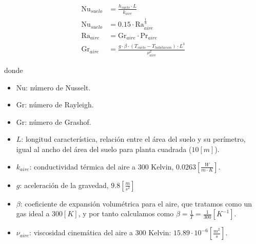 \begin{align}
	\text{Nu}_{suelo} & = \frac{h_{suelo} \cdot L}{k_{aire}}                                                    \\
	\text{Nu}_{suelo} & = 0.15 \cdot \text{Ra}_{aire}^{\frac{1}{3}}  \label{eq:empirical_nu_natural_convection} \\
	\text{Ra}_{aire}  & = \text{Gr}_{aire} \cdot \text{Pr}_{aire}                                               \\
	\text{Gr}_{aire}  & = \frac{g \cdot \beta \cdot ( T_{suelo} - T_{habitacion} ) \cdot L^3}{\nu_{aire}^2}
\end{align}


donde

\begin{itemize}
	\item $\text{Nu}$: número de Nusselt.
	\item $\text{Gr}$: número de Rayleigh.
	\item $\text{Gr}$: número de Grashof.
	\item $L$: longitud característica, relación entre el área del suelo y su
	      perímetro, igual al ancho del área del suelo para planta cuadrada
	      ($10[m]$).
	\item $k_{aire}$: conductividad térmica del aire a 300 Kelvin, $0.0263\left[ \frac{W}{m \cdot K} \right]$.
	\item $g$: aceleración de la gravedad, $9.8\left[\frac{m}{s^2}\right]$
	\item $\beta$: coeficiente de expansión volumétrica para el aire, que
	      tratamos como un gas ideal a $300[K]$, y por tanto calculamos como $\beta =
		      \frac{1}{T} = \frac{1}{300} \left[K^{-1}\right]$.
	\item $\nu_{aire}$: viscosidad cinemática del aire a 300 Kelvin: $15.89 \cdot 10^{-6} \left[\frac{m^2}{s}\right]$.
\end{itemize}
